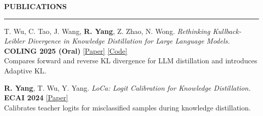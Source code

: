 \documentclass[11pt,a4paper]{article}
\newcommand{\venuebadge}[1]{\begingroup\setlength{\fboxsep}{1.5pt}\colorbox{venuefill}{\textcolor{venuetext}{\bfseries #1}}\endgroup}
\newenvironment{rSection}[1]{
  \Needspace{7\baselineskip}\medskip
  \textbf{#1}\smallskip\hrule\smallskip
}{\par}
\begin{document}
\begin{rSection}{PUBLICATIONS}
\begin{enumerate}[label={[\arabic*]}]
\item\begin{samepage} T. Wu, C. Tao, J. Wang, \textbf{R. Yang}, Z. Zhao, N. Wong. \textit{Rethinking Kullback-Leibler Divergence in Knowledge Distillation for Large Language Models.} \venuebadge{COLING 2025 (Oral)} \href{https://aclanthology.org/2025.coling-main.383/}{[Paper]} \href{https://github.com/wutaiqiang/LLM_KD_AKL}{[Code]}\\[1pt]{\textcolor{summarytext}{Compares forward and reverse KL divergence for LLM distillation and introduces Adaptive KL.}}\par\end{samepage}
\item\begin{samepage} \textbf{R. Yang}, T. Wu, Y. Yang. \textit{LoCa: Logit Calibration for Knowledge Distillation.} \venuebadge{ECAI 2024} \href{https://doi.org/10.3233/FAIA240767}{[Paper]}\\[1pt]{\textcolor{summarytext}{Calibrates teacher logits for misclassified samples during knowledge distillation.}}\par\end{samepage}
\end{enumerate}\end{rSection}\normalsize
\end{document}
